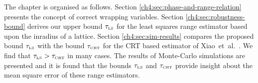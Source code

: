 The chapter is organised as follows. Section \ref{ch4:sec:phase-and-range-relation} presents the concept of correct wrapping variables.  Section \ref{ch4:sec:robustness-bound} derives our upper bound $\tau_{\text{\tiny{LS}}}$ for the least squares range estimator based upon the inradius of a lattice.  Section \ref{ch4:sec:sim-results} compares the proposed bound $\tau_{\text{\tiny{LS}}}$ with the bound $\tau_{\text{\tiny{CRT}}}$ for the CRT based estimator of Xiao~et~al.~\cite{Xiao_multistage_crt_2014}.  We find that $\tau_{\text{\tiny{LS}}} > \tau_{\text{\tiny{CRT}}}$ in many cases.  The results of Monte-Carlo simulations are presented and it is found that the bounds $\tau_{\text{\tiny{LS}}}$ and $\tau_{\text{\tiny{CRT}}}$ provide insight about the mean square error of these range estimators.

